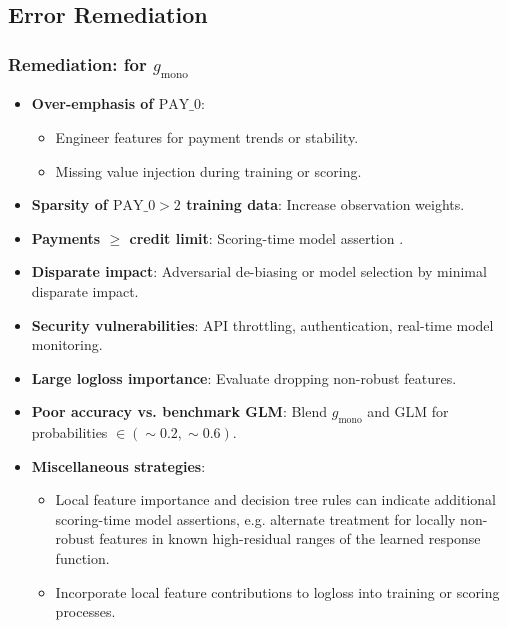 \documentclass[11pt,
               aspectratio=169,
               hyperref={colorlinks}
               ]{beamer}
\begin{document}
		\subsection{Error Remediation}

			\begin{frame}
		
				\frametitle{\textbf{Remediation}: for $g_{\text{mono}}$}
				
				\begin{itemize}\scriptsize
					\item \textbf{Over-emphasis of $\text{PAY\_0}$}:
					\begin{itemize}\scriptsize
						\item Engineer features for payment trends or stability.
						\item Missing value injection during training or scoring.
					\end{itemize}
					\item \textbf{Sparsity of $\text{PAY\_0} > 2$ training data}: Increase observation weights. 
					\item \textbf{Payments $\geq$ credit limit}: Scoring-time model assertion \cite{kangdebugging}. 
					\item \textbf{Disparate impact}: Adversarial de-biasing \cite{zhang2018mitigating} or model selection by minimal disparate impact. 
					\item \textbf{Security vulnerabilities}: API throttling, authentication, real-time model monitoring. 
					\item \textbf{Large logloss importance}: Evaluate dropping non-robust features.
					\item \textbf{Poor accuracy vs. benchmark GLM}: Blend $g_{\text{mono}}$ and GLM for probabilities $\in (\sim0.2, \sim0.6)$.
					\item \textbf{Miscellaneous strategies}: 
					\begin{itemize}\scriptsize
						\item Local feature importance and decision tree rules can indicate additional scoring-time model assertions, e.g. alternate treatment for locally non-robust features in known high-residual ranges of the learned response function. 
						\item Incorporate local feature contributions to logloss into training or scoring processes.
					\end{itemize}
				\end{itemize}
				\normalsize

			\end{frame}		
			
\end{document}
